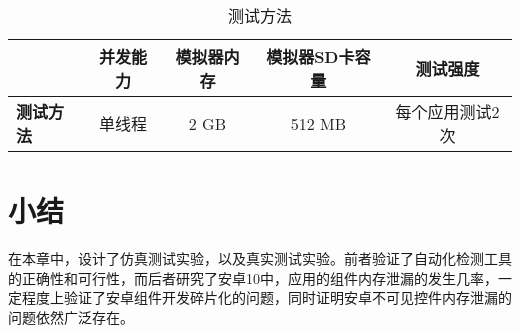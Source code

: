 \begin{table}[htb]\footnotesize
	\centering
	\caption{测试方法}
	\vspace{2mm}
	\begin{tabular}{lcccc}
		\toprule
		&\textbf{并发能力}&\textbf{模拟器内存}&\textbf{模拟器SD卡容量}&\textbf{测试强度}\\
		\midrule
		\textbf{测试方法}&单线程&2 GB&512 MB&每个应用测试2次\\
		\bottomrule
	\end{tabular}
	\label{table:method-compare}
\end{table}

\section{小结}
在本章中，设计了仿真测试实验，以及真实测试实验。前者验证了自动化检测工具的正确性和可行性，而后者研究了安卓10中，应用的组件内存泄漏的发生几率，一定程度上验证了安卓组件开发碎片化的问题，同时证明安卓不可见控件内存泄漏的问题依然广泛存在。